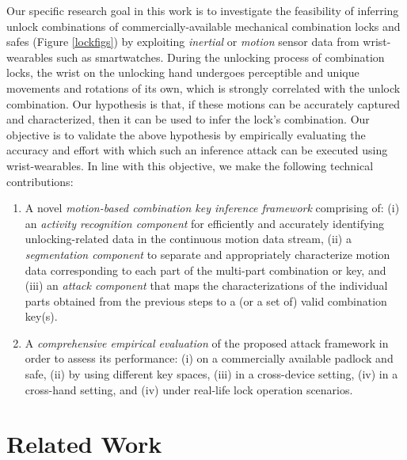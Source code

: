 \documentclass[]{IEEEtran}
\begin{document}
Our specific research goal in this work is to investigate the feasibility of inferring unlock combinations of commercially-available mechanical combination locks and safes (Figure \ref{lockfigs}) by exploiting \emph{inertial} or \emph{motion} sensor data from wrist-wearables such as smartwatches. During the unlocking process of combination locks, the wrist on the unlocking hand undergoes perceptible and unique movements and rotations of its own, which is strongly correlated with the unlock combination. Our hypothesis is that, if these motions can be accurately captured and characterized, then it can be used to infer the lock's combination. Our objective is to validate the above hypothesis by empirically evaluating the accuracy and effort with which such an inference attack can be executed using wrist-wearables. In line with this objective, we make the following technical contributions:

\begin{enumerate}[leftmargin=*]
\item A novel \emph{motion-based combination key inference framework} comprising of: (i) an \emph{activity recognition component} for efficiently and accurately identifying unlocking-related data in the continuous motion data stream, (ii) a \emph{segmentation component} to separate and appropriately characterize motion data corresponding to each part of the multi-part combination or key, and (iii) an \emph{attack component} that maps the characterizations of the individual parts obtained from the previous steps to a (or a set of) valid combination key(s).
\item A \emph{comprehensive empirical evaluation} of the proposed attack framework in order to assess its performance: (i) on a commercially available padlock and safe, (ii) by using different key spaces, (iii) in a cross-device setting, (iv) in a cross-hand setting, and (iv) under real-life lock operation scenarios.
\end{enumerate}

\section{Related Work}
\label{related}
\end{document}
